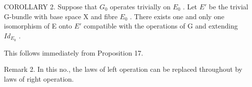 COROLLARY 2. Suppose that \(G_{0}\) operates trivially on \(E_{0}\) . Let \(E'\) be the trivial G-bundle with base space X and fibre \(E_{0}\) . There exists one and only one isomorphism of E onto \(E'\) compatible with the operations of G and extending \(Id_{E_{0}}\) .

This follows immediately from Proposition 17.

Remark 2. In this no., the laws of left operation can be replaced throughout by laws of right operation.


